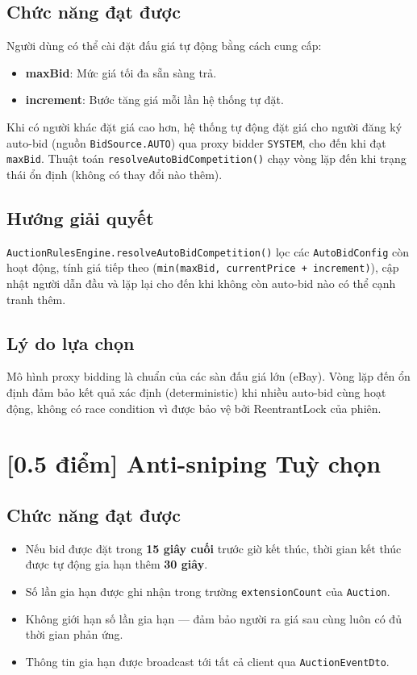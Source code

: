 \documentclass[12pt,a4paper]{article}
\newcommand{\score}[1]{\textbf{[#1 điểm]}}
\newcommand{\optional}{\textcolor{optionalcolor}{\textbf{Tuỳ chọn}}}
\newcommand{\filepath}[1]{\texttt{\small #1}}
\begin{document}
\subsection*{Chức năng đạt được}

Người dùng có thể cài đặt đấu giá tự động bằng cách cung cấp:
\begin{itemize}[leftmargin=1.5em]
  \item \textbf{maxBid}: Mức giá tối đa sẵn sàng trả.
  \item \textbf{increment}: Bước tăng giá mỗi lần hệ thống tự đặt.
\end{itemize}

Khi có người khác đặt giá cao hơn, hệ thống tự động đặt giá cho người đăng ký auto-bid (nguồn \texttt{BidSource.AUTO}) qua proxy bidder \texttt{SYSTEM}, cho đến khi đạt \texttt{maxBid}. Thuật toán \texttt{resolveAutoBidCompetition()} chạy vòng lặp đến khi trạng thái ổn định (không có thay đổi nào thêm).

\subsection*{Hướng giải quyết}
\filepath{AuctionRulesEngine.resolveAutoBidCompetition()} lọc các \texttt{AutoBidConfig} còn hoạt động, tính giá tiếp theo (\texttt{min(maxBid, currentPrice + increment)}), cập nhật người dẫn đầu và lặp lại cho đến khi không còn auto-bid nào có thể cạnh tranh thêm.

\subsection*{Lý do lựa chọn}
Mô hình proxy bidding là chuẩn của các sàn đấu giá lớn (eBay). Vòng lặp đến ổn định đảm bảo kết quả xác định (deterministic) khi nhiều auto-bid cùng hoạt động, không có race condition vì được bảo vệ bởi ReentrantLock của phiên.

\section{\score{0.5} Anti-sniping \hfill \optional}

\subsection*{Chức năng đạt được}

\begin{itemize}[leftmargin=1.5em]
  \item Nếu bid được đặt trong \textbf{15 giây cuối} trước giờ kết thúc, thời gian kết thúc được tự động gia hạn thêm \textbf{30 giây}.
  \item Số lần gia hạn được ghi nhận trong trường \texttt{extensionCount} của \texttt{Auction}.
  \item Không giới hạn số lần gia hạn — đảm bảo người ra giá sau cùng luôn có đủ thời gian phản ứng.
  \item Thông tin gia hạn được broadcast tới tất cả client qua \texttt{AuctionEventDto}.
\end{itemize}
\end{document}
